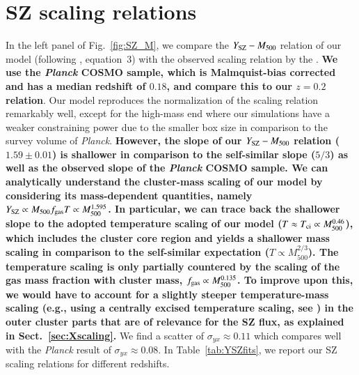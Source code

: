 \documentclass[useAMS,usenatbib]{mn2e}
\begin{document}
\section{SZ scaling relations}
\label{sec:5}
In the left panel of Fig.~\ref{fig:SZ_M}, we compare the $Y_{{\mathrm{SZ}}}-M_{500}$
relation of our model (following \citealp{2012ApJ...758...74B}, equation~3) with
the observed scaling relation by the \cite{2013arXiv1303.5080P}. {\bf We use the
  \emph{Planck} COSMO sample, which is Malmquist-bias corrected and has a median
  redshift of $0.18$, and compare this to our $z=0.2$ relation}. Our model
reproduces the normalization of the scaling relation remarkably well, except for
the high-mass end where our simulations have a weaker constraining power due to
the smaller box size in comparison to the survey volume of {\em Planck}.  {\bf
  However, the slope of our $Y_{{\mathrm{SZ}}}-M_{500}$ relation ($1.59\pm0.01$) is
  shallower in comparison to the self-similar slope ($5/3$) as well as the
  observed slope of the \emph{Planck} COSMO sample. We can analytically
  understand the cluster-mass scaling of our model by considering its
  mass-dependent quantities, namely $Y_{{\mathrm{SZ}}}\propto M_{500} f_{{\mathrm{gas}}}
  T \propto M_{500}^{1.595}$. In particular, we can trace back the
  shallower slope to the adopted temperature scaling of our model
  ($T\approx T_{{\mathrm{ci}}}\propto M_{500}^{0.46}$), which includes the cluster core region
  and yields a shallower mass scaling in comparison to the self-similar
  expectation ($T\propto M_{500}^{2/3}$). The temperature scaling is only
  partially countered by the scaling of the gas mass fraction with cluster mass,
  $f_{{\mathrm{gas}}}\propto M_{500}^{0.135}$. To improve upon this, we would have to
  account for a slightly steeper temperature-mass scaling (e.g., using a
  centrally excised temperature scaling, see \citealt{2010MNRAS.406.1773M}) in
  the outer cluster parts that are of relevance for the SZ flux, as explained in
  Sect.~\ref{sec:Xscaling}. }  We find a scatter of $\sigma_{yx} \approx 0.11$
which compares well with the \emph{Planck} result of $\sigma_{yx} \approx
0.08$. In Table~\ref{tab:YSZfits}, we report our SZ scaling relations for
different redshifts.
\end{document}
